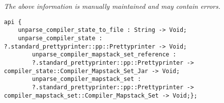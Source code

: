 \label{api:Unparse\_Compiler\_State}

{\tiny \it The above information is manually maintained and may contain errors.}
\begin{verbatim}
api {
    unparse_compiler_state_to_file : String -> Void;
    unparse_compiler_state : ?.standard_prettyprinter::pp::Prettyprinter -> Void;
        unparse_compiler_mapstack_set_reference :
        ?.standard_prettyprinter::pp::Prettyprinter -> compiler_state::Compiler_Mapstack_Set_Jar -> Void;
        unparse_compiler_mapstack_set :
        ?.standard_prettyprinter::pp::Prettyprinter -> compiler_mapstack_set::Compiler_Mapstack_Set -> Void;};
\end{verbatim}
